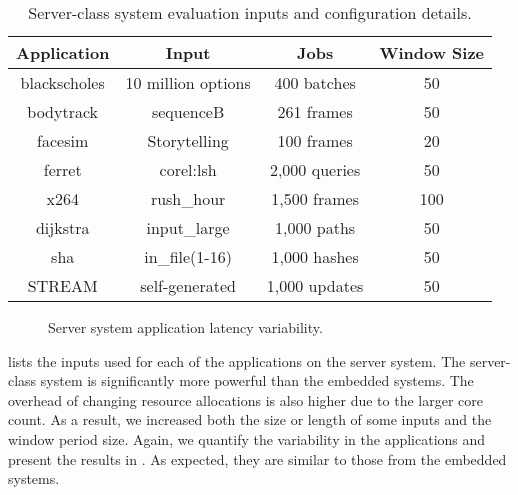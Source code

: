 \begin{table}[t]
\small
\centering
\caption{Server-class system evaluation inputs and configuration details.}
\begin{tabular}{cccc}
  \textbf{Application} & \textbf{Input} & \textbf{Jobs} & \textbf{Window Size} \\
  \hline
  \hline
  blackscholes   & 10 million options             & 400 batches   & 50 \\
  bodytrack      & sequenceB                      & 261 frames    & 50 \\
  facesim        & Storytelling                   & 100 frames    & 20 \\
  ferret         & corel:lsh                      & 2,000 queries & 50 \\
  x264           & rush\_hour                     & 1,500 frames  & 100 \\
  dijkstra       & input\_large                   & 1,000 paths   & 50 \\
  sha            & in\_file(1-16)                 & 1,000 hashes  & 50 \\
  STREAM         & self-generated                 & 1,000 updates & 50 \\
  \hline
  \hline
\end{tabular}
\label{tbl:poet-server-inputs}
\end{table}

\begin{figure}[t]
  
  \caption{Server system application latency variability.}
  \label{fig:poet-server-variation}
\end{figure}

 lists the inputs used for each of the applications on the server system.
The server-class system is significantly more powerful than the embedded systems.
The overhead of changing resource allocations is also higher due to the larger core count.
As a result, we increased both the size or length of some inputs and the window period size.
Again, we quantify the variability in the applications and present the results in .
As expected, they are similar to those from the embedded systems.
